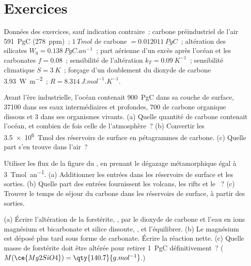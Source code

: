 \section*{Exercices}\label{sec:b2:deep-time-climate:exercises}

Données des exercices, sauf indication contraire~: carbone préindustriel de l'air
\qty{591}{PgC} (\qty{278}{ppm})~; $\qty{1}{Tmol}$ de carbone $= \qty{0.012011}{PgC}$~;
altération des silicates $W_0 = \qty{0.138}{PgC.an^{-1}}$~; part aérienne d'un excès après l'océan et les carbonates $f = 0.08$~;
sensibilité de l'altération $k_T = \qty{0.09}{K^{-1}}$~; sensibilité climatique $S =
\qty{3}{K}$~; forçage d'un doublement du dioxyde de carbone \qty{3.93}{W.m^{-2}}~; $R =
\qty{8.314}{J.mol^{-1}.K^{-1}}$.

\begin{exercise}[$\star$]\label{exo:b2:deep-time-climate:1}
Avant l'ère industrielle, l'océan contenait \qty{900}{PgC} dans sa couche de surface, \num{37100} dans ses eaux
intermédiaires et profondes, 700 de carbone organique dissous et 3 dans ses organismes vivants.
(a) Quelle quantité de carbone contenait l'océan, et combien de fois celle de l'atmosphère~? (b) Convertir les
\qty{3.5e6}{Tmol} des réservoirs de surface en pétagrammes de carbone. (c) Quelle part s'en trouve dans
l'air~?
\end{exercise}

\begin{exercise}[$\star$]\label{exo:b2:deep-time-climate:2}
Utiliser les flux de la figure du , en prenant le dégazage métamorphique égal à
\qty{3}{Tmol.an^{-1}}. (a) Additionner les entrées dans les réservoirs de surface et les sorties.
(b) Quelle part des entrées fournissent les volcans, les rifts et le ~? (c) Trouver le temps de
séjour du carbone dans les réservoirs de surface, à partir des sorties.
\end{exercise}

\begin{exercise}[$\star$]\label{exo:b2:deep-time-climate:3}
(a) Écrire l'altération de la forstérite, , par le dioxyde de carbone et l'eau en ions magnésium et
bicarbonate et silice dissoute, , et l'équilibrer. (b) Le magnésium est déposé plus tard sous forme de
carbonate. Écrire la réaction nette. (c) Quelle masse de forstérite doit être altérée pour retirer \qty{1}{PgC} définitivement~?
($M(\ce{Mg2SiO4}) = \qty{140.7}{g.mol^{-1}}$.)
\end{exercise}

